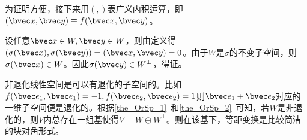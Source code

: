 为证明方便，接下来用$(,)$表广义内积运算，即$(\bvec  x,\bvec y)\equiv f( \bvec x,\bvec  y) $。

设任意$\bvec x\in W,\bvec y\in W$，则由定义得$(\sigma (\bvec x),\sigma(\bvec y))=(\bvec x,\bvec y)=0$。由于$W$是$\sigma$的不变子空间，则$\sigma (\bvec x)\in W$。因此$\sigma(\bvec y)\in W^{\bot}$，得证。


非退化线性空间是可以有退化的子空间的。比如$f(\bvec e_1,\bvec e_1)=-1,f(\bvec e_2,\bvec e_2)=1$则$\bvec e_1+\bvec e_2$对应的一维子空间便是退化的。根据\autoref{the_OrSp_1}~和\autoref{the_OrSp_2}~可知，若$W$是非退化的，则$V$内总存在一组基使得$V=W\oplus W^{\bot}$。则在该基下，等距变换是比较简洁的块对角形式。